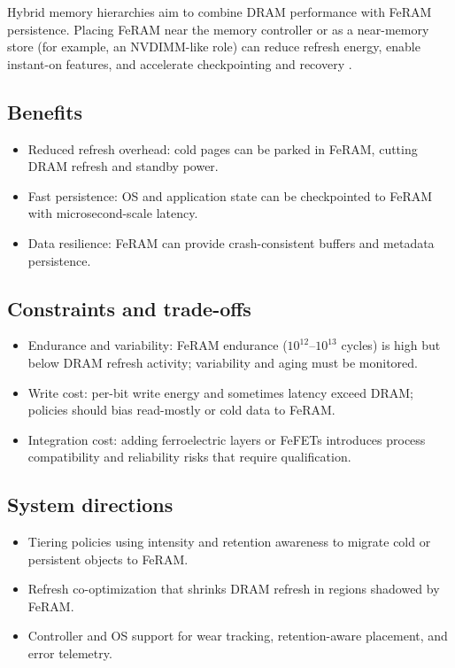 Hybrid memory hierarchies aim to combine DRAM performance with FeRAM persistence. Placing FeRAM near the memory controller or as a near-memory store (for example, an NVDIMM-like role) can reduce refresh energy, enable instant-on features, and accelerate checkpointing and recovery \cite{noheda2023,kim2021_dram}.

\subsection*{Benefits}
\begin{itemize}
  \item Reduced refresh overhead: cold pages can be parked in FeRAM, cutting DRAM refresh and standby power.
  \item Fast persistence: OS and application state can be checkpointed to FeRAM with microsecond-scale latency.
  \item Data resilience: FeRAM can provide crash-consistent buffers and metadata persistence.
\end{itemize}

\subsection*{Constraints and trade-offs}
\begin{itemize}
  \item Endurance and variability: FeRAM endurance ($10^{12}$--$10^{13}$ cycles) is high but below DRAM refresh activity; variability and aging must be monitored.
  \item Write cost: per-bit write energy and sometimes latency exceed DRAM; policies should bias read-mostly or cold data to FeRAM.
  \item Integration cost: adding ferroelectric layers or FeFETs introduces process compatibility and reliability risks that require qualification.
\end{itemize}

\subsection*{System directions}
\begin{itemize}
  \item Tiering policies using intensity and retention awareness to migrate cold or persistent objects to FeRAM.
  \item Refresh co-optimization that shrinks DRAM refresh in regions shadowed by FeRAM.
  \item Controller and OS support for wear tracking, retention-aware placement, and error telemetry.
\end{itemize}
